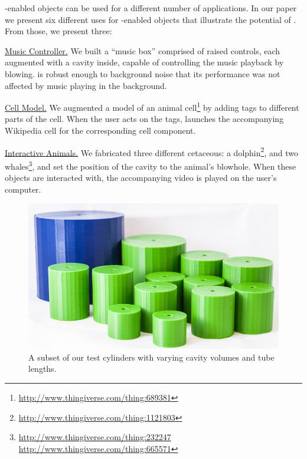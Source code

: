             \bh-enabled objects can be used for a different number of
            applications. In our paper we present six different uses for
            \bh-enabled objects that illustrate the potential of \bh. From
            those, we present three:

            \underline{Music Controller.} We built a ``music box'' comprised of
              raised controls, each augmented with a \bh cavity inside, capable
              of controlling the music playback by blowing. \bh is robust enough
              to background noise that its performance was not affected by music
              playing in the background.

            \underline{Cell Model.} We augmented a model of an animal
              cell\footnote{\url{http://www.thingiverse.com/thing:689381}} by
              adding \bh tags to different parts of the cell. When the user acts
              on the tags, \bh launches the accompanying Wikipedia cell for the
              corresponding cell component.

            \underline{Interactive Animals.} We fabricated three different
              cetaceous: a
              dolphin\footnote{\url{http://www.thingiverse.com/thing:1121803}},
              and two
              whales\footnote{\url{http://www.thingiverse.com/thing:232247}\\
              \url{http://www.thingiverse.com/thing:665571}}, and set the
              position of the cavity to the animal's blowhole. When these objects
              are interacted with, the accompanying video is played on the user's
              computer.

            \begin{figure}
              \centering
              \includegraphics[width=.95\columnwidth]{figures/cylinders.jpg}
              \caption{A subset of our test cylinders with varying cavity
                volumes and tube lengths.}
              \label{fig:cylinders}
            \end{figure}

